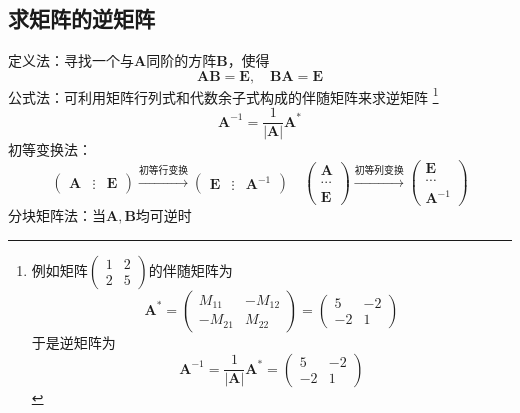 \subsection{求矩阵的逆矩阵}

定义法：寻找一个与$\boldsymbol{A}$同阶的方阵$\boldsymbol{B}$，使得
$$
    \boldsymbol{AB}=\boldsymbol{E}
    ,\quad
    \boldsymbol{BA}=\boldsymbol{E}
$$
公式法：可利用矩阵行列式和代数余子式构成的伴随矩阵来求逆矩阵 \footnote{
    例如矩阵$\begin{pmatrix} 1 & 2 \\ 2 & 5 \end{pmatrix}$的伴随矩阵为
    $$
        \boldsymbol{A}^* = \begin{pmatrix}
            M_{11}  & -M_{12} \\
            -M_{21} & M_{22}
        \end{pmatrix} = \begin{pmatrix}
            5  & -2 \\
            -2 & 1
        \end{pmatrix}
    $$
    于是逆矩阵为
    $$
        \boldsymbol{A}^{-1}
        =\frac{1}{|\boldsymbol{A}|}\boldsymbol{A}^*
        =\begin{pmatrix}
            5  & -2 \\
            -2 & 1
        \end{pmatrix}
    $$
}
$$
    \boldsymbol{A}^{-1} = \frac{1}{|\boldsymbol{A}|}\boldsymbol{A}^*
$$
初等变换法：
$$
    \begin{pmatrix}
        \boldsymbol{A} & \vdots & \boldsymbol{E}
    \end{pmatrix}
    \xrightarrow[]{\text{初等行变换}}
    \begin{pmatrix}
        \boldsymbol{E} & \vdots & \boldsymbol{A}^{-1}
    \end{pmatrix}
    \quad
    \begin{pmatrix}
        \boldsymbol{A} \\
        \cdots         \\
        \boldsymbol{E}
    \end{pmatrix}
    \xrightarrow[]{\text{初等列变换}}
    \begin{pmatrix}
        \boldsymbol{E} \\
        \cdots         \\
        \boldsymbol{A}^{-1}
    \end{pmatrix}
$$
分块矩阵法：当$\boldsymbol{A}, \boldsymbol{B}$均可逆时
